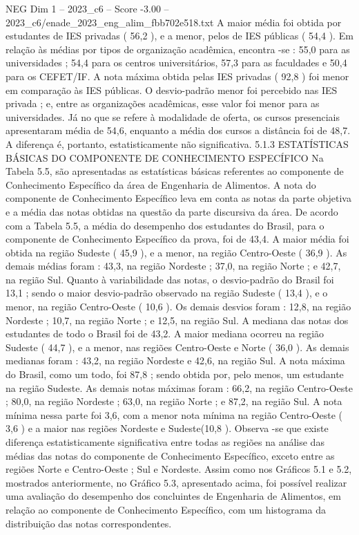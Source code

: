 \begin{textsample}{NEG Dim 1 – 2023\_c6 – Score -3.00 – 2023\_c6/enade\_2023\_eng\_alim\_fbb702e518.txt}
A maior média foi obtida por estudantes de IES privadas ( 56,2 ), e a menor, pelos de IES públicas ( 54,4 ).
Em relação às médias por tipos de organização acadêmica, encontra -se : 55,0 para as universidades ; 54,4 para os centros universitários, 57,3 para as faculdades e 50,4 para os CEFET/IF.
A nota máxima obtida pelas IES privadas ( 92,8 ) foi menor em comparação às IES públicas.
O desvio-padrão menor foi percebido nas IES privada ; e, entre as organizações acadêmicas, esse valor foi menor para as universidades.
Já no que se refere à modalidade de oferta, os cursos presenciais apresentaram média de 54,6, enquanto a média dos cursos a distância foi de 48,7.
A diferença é, portanto, estatisticamente não significativa. 5.1.3 ESTATÍSTICAS BÁSICAS DO COMPONENTE DE CONHECIMENTO ESPECÍFICO Na Tabela 5.5, são apresentadas as estatísticas básicas referentes ao componente de Conhecimento Específico da área de Engenharia de Alimentos.
A nota do componente de Conhecimento Específico leva em conta as notas da parte objetiva e a média das notas obtidas na questão da parte discursiva da área.
De acordo com a Tabela 5.5, a média do desempenho dos estudantes do Brasil, para o componente de Conhecimento Específico da prova, foi de 43,4.
A maior média foi obtida na região Sudeste ( 45,9 ), e a menor, na região Centro-Oeste ( 36,9 ).
As demais médias foram : 43,3, na região Nordeste ; 37,0, na região Norte ; e 42,7, na região Sul.
Quanto à variabilidade das notas, o desvio-padrão do Brasil foi 13,1 ; sendo o maior desvio-padrão observado na região Sudeste ( 13,4 ), e o menor, na região Centro-Oeste ( 10,6 ).
Os demais desvios foram : 12,8, na região Nordeste ; 10,7, na região Norte ; e 12,5, na região Sul.
A mediana das notas dos estudantes de todo o Brasil foi de 43,2.
A maior mediana ocorreu na região Sudeste ( 44,7 ), e a menor, nas regiões Centro-Oeste e Norte ( 36,0 ).
As demais medianas foram : 43,2, na região Nordeste e 42,6, na região Sul.
A nota máxima do Brasil, como um todo, foi 87,8 ; sendo obtida por, pelo menos, um estudante na região Sudeste.
As demais notas máximas foram : 66,2, na região Centro-Oeste ; 80,0, na região Nordeste ; 63,0, na região Norte ; e 87,2, na região Sul.
A nota mínima nessa parte foi 3,6, com a menor nota mínima na região Centro-Oeste ( 3,6 ) e a maior nas regiões Nordeste e Sudeste(10,8 ).
Observa -se que existe diferença estatisticamente significativa entre todas as regiões na análise das médias das notas do componente de Conhecimento Específico, exceto entre as regiões Norte e Centro-Oeste ; Sul e Nordeste.
Assim como nos Gráficos 5.1 e 5.2, mostrados anteriormente, no Gráfico 5.3, apresentado acima, foi possível realizar uma avaliação do desempenho dos concluintes de Engenharia de Alimentos, em relação ao componente de Conhecimento Específico, com um histograma da distribuição das notas correspondentes.

\end{textsample}
